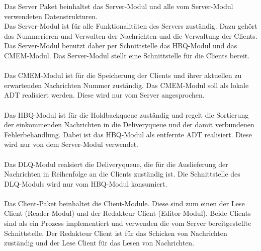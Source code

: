 \documentclass{article}
\begin{document}
Das Server Paket beinhaltet das Server-Modul und alle vom Server-Modul verwendeten Datenstrukturen.\\
Das Server-Modul ist für alle Funktionalitäten des Servers zuständig. Dazu gehört das Nummerieren und Verwalten der Nachrichten und die Verwaltung der Clients.\\
Das Server-Modul benutzt daher per Schnittstelle das HBQ-Modul und das CMEM-Modul. Das Server-Modul stellt eine Schnittstelle für die Clients bereit.\\
\\
Das CMEM-Modul ist für die Speicherung der Clients und ihrer aktuellen zu erwartenden Nachrichten Nummer zuständig. Das CMEM-Modul soll als lokale ADT realisiert werden. Diese wird nur vom Server angesprochen.\\
\\
Das HBQ-Modul ist für die Holdbackqueue zuständig und regelt die Sortierung der einkommenden Nachrichten in die Deliveryqueue und der damit verbundenen Fehlerbehandlung. Dabei ist das HBQ-Modul als entfernte ADT realisiert. Diese wird nur von dem Server-Modul verwendet.\\
\\
Das DLQ-Modul realsiert die Deliveryqueue, die für die Auslieferung der Nachrichten in Reihenfolge an die Clients zuständig ist. Die Schnittstelle des DLQ-Moduls wird nur vom HBQ-Modul konsumiert.\\
\\
Das Client-Paket beinhaltet die Client-Module. Diese sind zum einen der Lese Client (Reader-Modul) und der Redakteur Client (Editor-Modul). Beide Clients sind als ein Prozess implementiert und verwenden die vom Server bereitgestellte Schnittstelle. Der Redakteur Client ist für das Schicken von Nachrichten zuständig und der Lese Client für das Lesen von Nachrichten.
\end{document}
